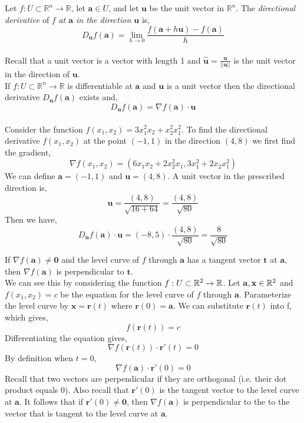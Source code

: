 \documentclass[12pt]{article}
\begin{document}
 Let $f:U\subset\mathbb{R}^n\rightarrow\mathbb{R}$, let $\mathbf{a}\in U$, and let $\mathbf{u}$ be the unit vector in $\mathbb{R}^n$. The \emph{directional derivative} of $f$ \emph{at $\mathbf{a}$ in the direction $\mathbf{u}$} is,
\[
D_{\mathbf{u}}f(\mathbf{a}) = \lim_{h\rightarrow0} \frac{f(\mathbf{a}+h\mathbf{u})-f(\mathbf{a})}{h}
\] \\

 Recall that a unit vector is a vector with length 1 and $\hat{\mathbf{u}} = \frac{\mathbf{u}}{||\mathbf{u}||}$ is the unit vector in the direction of $\mathbf{u}$. \\

 If $f:U\subset\mathbb{R}^n\rightarrow\mathbb{R}$ is differentiable at $\mathbf{a}$ and $\mathbf{u}$ is a unit vector then the directional derivative $D_{\mathbf{u}}f(\mathbf{a})$ exists and,
\[
D_{\mathbf{u}}f(\mathbf{a}) = \nabla f(\mathbf{a})\cdot\mathbf{u} 
\] \\

 Consider the function $f(x_1,x_2) = 3x_1^2x_2 + x_2^2x_1^2$. To find the directional derivative $f(x_1,x_2)$ at the point $(-1,1)$ in the direction $(4,8)$ we first find the gradient,
\[
\nabla f(x_1,x_2) =  (6x_1x_2 + 2x_2^2x_1, 3x_1^2+2x_2x_1^2)
\]
We can define $\mathbf{a}=(-1,1)$ and $\mathbf{u}=(4,8)$. A unit vector in the prescribed direction is,
\[
\mathbf{u} = \frac{(4,8)}{\sqrt{16+64}} = \frac{(4,8)}{\sqrt{80}}
\]
Then we have,
\[
D_{\mathbf{u}}f(\mathbf{a}) \cdot \mathbf{u} =  (-8,5) \cdot \frac{(4,8)}{\sqrt{80}} = \frac{8}{\sqrt{80}}
\]

 If $\nabla f(\mathbf{a})\neq\mathbf{0}$ and the level curve of $f$ through $\mathbf{a}$ has a tangent vector $\mathbf{t}$ at $\mathbf{a}$, then $\nabla f(\mathbf{a})$ is perpendicular to $\mathbf{t}$.\\

 We can see this by considering the function $f:U\subset\mathbb{R}^2\rightarrow\mathbb{R}$. Let $\mathbf{a},\mathbf{x}\in\mathbb{R}^2$ and $f(x_1,x_2)=c$ be the equation for the level curve of $f$ through $\mathbf{a}$. Parameterize the level curve by $\mathbf{x}=\mathbf{r}(t)$ where $\mathbf{r}(0)=\mathbf{a}$. We can substitute $\mathbf{r}(t)$ into f, which gives,
\[
f(\mathbf{r}(t)) = c
\]
Differentiating the equation gives,
\[
\nabla f(\mathbf{r}(t))\cdot\mathbf{r}'(t) = 0
\]
By definition when $t=0$,
\[
\nabla f(\mathbf{a})\cdot\mathbf{r}'(0) = 0
\]
Recall that two vectors are perpendicular if they are orthogonal (i.e. their dot product equals 0). Also recall that $\mathbf{r}'(0)$ is the tangent vector to the level curve at $\mathbf{a}$. It follows that if $\mathbf{r}'(0)\neq\mathbf{0}$, then $\nabla f(\mathbf{a})$ is perpendicular to the to the vector that is tangent to the level curve at $\mathbf{a}$. \\
\end{document}
